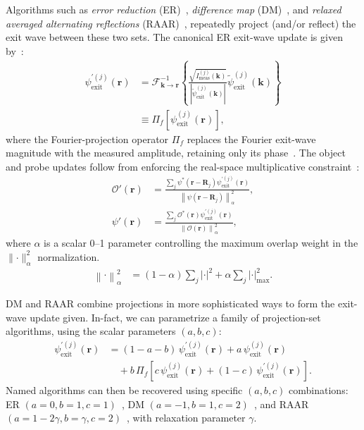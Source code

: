 \documentclass[pdflatex,sn-aps,iicol]{sn-jnl}%
\begin{document}
Algorithms such as \emph{error reduction} (ER)~\cite{Levi_1984}, \emph{difference map} (DM)~\cite{Elser_2003,Thibault_2008}, and \emph{relaxed averaged alternating reflections} (RAAR)~\cite{Luke_2004}, repeatedly project (and/or reflect) the exit wave between these two sets.
The canonical ER exit-wave update is given by~\cite{Bauschke_2002}:
\begin{align}
\psi_{\text{exit}}^{'(j)}(\boldsymbol{r})
&=
\mathcal{F}_{\boldsymbol{k}\to\boldsymbol{r}}^{-1}
\left\{
\frac{\sqrt{I_{\text{meas}}^{(j)}(\boldsymbol{k})}}{\left\lvert \tilde{\psi}_{\text{exit}}^{(j)}(\boldsymbol{k}) \right\rvert}
\tilde{\psi}_{\text{exit}}^{(j)}(\boldsymbol{k})
\right\}
\nonumber\\
&\equiv
\Pi_f\!\left[\psi_{\text{exit}}^{(j)}(\boldsymbol{r})\right],
\label{eq:proj-exit-wave}
\end{align}
where the Fourier-projection operator $\Pi_f$ replaces the Fourier exit-wave magnitude with the measured amplitude, retaining only its phase~\cite{Fienup_1982,Bauschke_2002}.
The object and probe updates follow from enforcing the real-space multiplicative constraint~\cite{Thibault_2008}:
\begin{align}
\mathcal{O}'(\boldsymbol{r})
&=
\frac{
\sum_j
\psi^{*}(\boldsymbol{r}-\boldsymbol{R}_j)
\psi_{\text{exit}}^{'(j)}(\boldsymbol{r})
}{
\left \lVert \psi(\boldsymbol{r}-\boldsymbol{R}_j)\right \rVert^2_{\alpha}},\\
\psi'(\boldsymbol{r})
&=
\frac{
\sum_j
\mathcal{O}^{*}(\boldsymbol{r})
\psi_{\text{exit}}^{'(j)}(\boldsymbol{r})
}{
\left \lVert\mathcal{O}(\boldsymbol{r})\right \rVert^2_{\alpha}
},
\label{eq:proj-update}
\end{align}
where $\alpha$ is a scalar 0--1 parameter controlling the maximum overlap weight in the $\lVert\cdot\rVert^2_{\alpha}$ normalization.
\begin{align}
\left \lVert\cdot \right \rVert ^2_{\alpha}
&=
(1-\alpha)\sum_j \lvert \cdot \rvert^2
+
\alpha \sum_j \lvert \cdot \rvert^2_{\text{max}}.
\label{eq:normalization}
\end{align}

DM and RAAR combine projections in more sophisticated ways to form the exit-wave update given.
In-fact, we can parametrize a family of projection-set algorithms, using the scalar parameters $(a,b,c)$:
\begin{align}
\psi_{\text{exit}}^{'(j)}(\boldsymbol{r})
&=
(1-a-b)\,\psi_{\text{exit}}^{'(j)}(\boldsymbol{r})
+
a\,\psi_{\text{exit}}^{(j)}(\boldsymbol{r})
\nonumber\\
&\quad+
b\,\Pi_f\!\left[
c\,\psi_{\text{exit}}^{(j)}(\boldsymbol{r})
+
(1-c)\,\psi_{\text{exit}}^{'(j)}(\boldsymbol{r})
\right].
\label{eq:proj-fam}
\end{align}
Named algorithms can then be recovered using specific $(a,b,c)$ combinations:
ER $(a=0,b=1,c=1)$~\cite{Levi_1984}, DM $(a=-1,b=1,c=2)$~\cite{Elser_2003}, and RAAR $(a=1-2\gamma,b=\gamma,c=2)$~\cite{Luke_2004}, with relaxation parameter $\gamma$.
\end{document}
